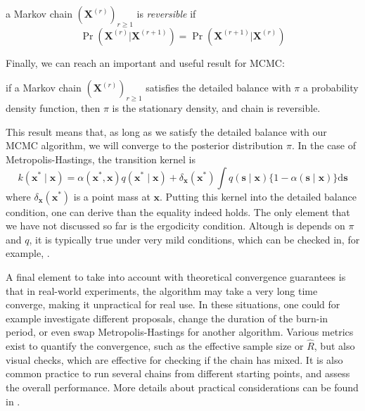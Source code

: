 \documentclass[12pt]{memoir}
\newcommand{\mb}{\mathbf}
\newcommand{\ti}{\textit}
\begin{document}
\begin{boxedthm}
    a Markov chain $(\mb X^{(r)})_{r\geq1}$ is \ti{reversible} if
\begin{equation}
    \Pr(\mb X^{(r)} | \mb X^{(r+1)}) = \Pr(\mb X^{(r+1)} | \mb X^{(r)})
\end{equation}
\end{boxedthm}
Finally, we can reach an important and useful result for MCMC:

\begin{boxedthm}
    if a Markov chain $(\mb X^{(r)})_{r\geq1}$ satisfies the detailed balance with $\pi$ a probability density function, then $\pi$ is the stationary density, and chain is reversible.
\end{boxedthm}

This result means that, as long as we satisfy the detailed balance with our MCMC algorithm, we will converge to the posterior distribution $\pi$. In the case of Metropolis-Hastings, the transition kernel is 
\begin{equation}\label{eq:mh-transition-kernel}
    k\left(\boldsymbol{x}^* \mid \boldsymbol{x}\right)=\alpha\left(\boldsymbol{x}^*, \boldsymbol{x}\right) q\left(\boldsymbol{x}^* \mid \boldsymbol{x}\right)+\delta_{\boldsymbol{x}}\left(\boldsymbol{x}^*\right) \int q(\boldsymbol{s} \mid \boldsymbol{x})\{1-\alpha(\boldsymbol{s} \mid \boldsymbol{x})\} \mathrm{d} \boldsymbol{s}
\end{equation}
where $\delta_{\mb x}(\mb x^*)$ is a point mass at $\mb x$. Putting this kernel into the detailed balance condition, one can derive than the equality indeed holds. The only element that we have not discussed so far is the ergodicity condition. Altough is depends on $\pi$ and $q$, it is typically true under very mild conditions, which can be checked in, for example, \cite{mcmc:RobertCasella2004}.\medbreak

A final element to take into account with theoretical convergence guarantees is that in real-world experiments, the algorithm may take a very long time converge, making it unpractical for real use. In these situations, one could for example investigate different proposals, change the duration of the burn-in period, or even swap Metropolis-Hastings for another algorithm. Various metrics exist to quantify the convergence, such as the effective sample size or $\hat R$, but also visual checks, which are effective for checking if the chain has mixed. It is also common practice to run several chains from different starting points, and assess the overall performance. More details about practical considerations can be found in \cite{mcmc:gelman2013bayesian}.
\end{document}
